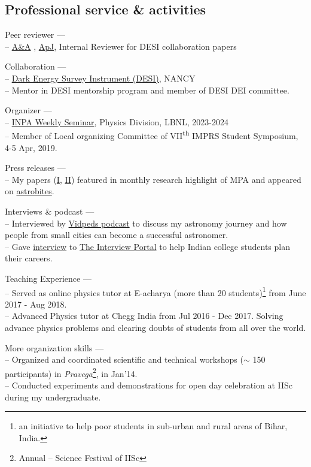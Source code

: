 \documentclass[12pt,letterpaper]{article}
\begin{document}
\subsection{Professional service \& activities}
\begin{list}{}{\cvlist}
    \item Peer reviewer --- \\
    -- \href{https://en.wikipedia.org/wiki/Astronomy_%26_Astrophysics}{A\&A}
    , \href{https://en.wikipedia.org/wiki/The_Astrophysical_Journal}{ApJ}, Internal Reviewer for DESI collaboration papers
    \item Collaboration --- \\
        -- \href{https://www.desi.lbl.gov/}{Dark Energy Survey Instrument (DESI)}, NANCY \\
        -- Mentor in DESI mentorship program and member of DESI DEI committee.
    \item Organizer --- \\
        -- \href{https://inpa.lbl.gov/events/}{INPA Weekly Seminar}, Physics Division, LBNL, 2023-2024 \\
        -- Member of Local organizing Committee of VII\textsuperscript{th} IMPRS Student Symposium, 4-5 Apr, 2019.
    \item Press releases --- \\
        -- My papers (\href{https://www.mpa-garching.mpg.de/964620/hl202107}{I}, \href{https://www.mpa-garching.mpg.de/1066558/hl202211?c=27981}{II}) featured in monthly research highlight of MPA and appeared on \href{https://astrobites.org/2021/05/06/cool-metal-gas-search-thanks-it-was-automated/}{astrobites}.
    \item Interviews \& podcast --- \\
      -- Interviewed by \href{https://www.youtube.com/watch?v=WmA_PnYLeCg}{Vidpeds podcast} to discuss my astronomy journey and how people from small cities can become a successful astronomer. \\
      -- Gave \href{https://theinterviewportal.com/2020/03/13/astrophysicist-interview-8/}{interview} to \href{https://theinterviewportal.com/}{The Interview Portal} to help Indian college students plan their careers.
    \item Teaching Experience --- \\
        -- Served as online physics tutor at E-acharya (more than 20 students)\footnote{an initiative to help poor students in sub-urban and rural areas of Bihar, India.} from June 2017 - Aug 2018. \\
        -- Advanced Physics tutor at Chegg India from Jul 2016 - Dec 2017. Solving advance physics problems and clearing doubts of students from all over the world.
  \item More organization skills --- \\
        -- Organized and coordinated scientific and technical workshops ($\sim$ 150 participants) in \emph{Pravega}\footnote{Annual -- Science Festival of IISc}, in Jan'14.\\
        -- Conducted experiments and demonstrations for open day celebration at IISc during my undergraduate.
\end{list}
\end{document}
